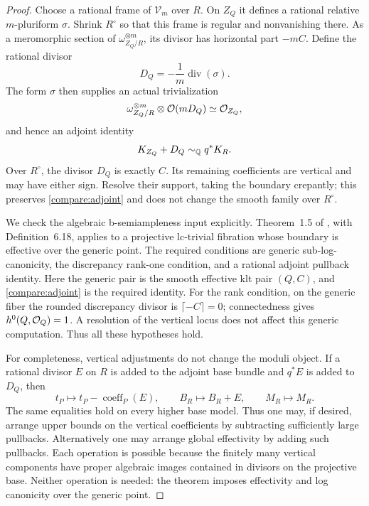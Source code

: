 \begin{proof}
Choose a rational frame of \(\mathcal V_m\) over \(R\).
On \(Z_Q\) it defines a rational relative \(m\)-pluriform
\(\sigma\).  Shrink \(R^\circ\) so that this frame is regular and
nonvanishing there.  As a meromorphic section of
\(\omega_{Z_Q/R}^{\otimes m}\), its divisor has horizontal part
\(-mC\).  Define the rational divisor
\begin{equation}
\label{compare:volume-boundary}
 D_Q=-\frac1m\operatorname{div}(\sigma).
\end{equation}
The form \(\sigma\) then supplies an actual trivialization
\[
 \omega_{Z_Q/R}^{\otimes m}\otimes\mathcal O(mD_Q)\simeq\mathcal O_{Z_Q},
\]
and hence an adjoint identity
\begin{equation}
\label{compare:adjoint}
 K_{Z_Q}+D_Q\sim_{\mathbb Q}q^*K_R.
\end{equation}
Over \(R^\circ\), the divisor \(D_Q\) is exactly \(C\).
Its remaining coefficients are vertical and may have either sign.
Resolve their support, taking the boundary crepantly; this preserves
\eqref{compare:adjoint} and does not change the smooth family over
\(R^\circ\).

We check the algebraic b-semiampleness input explicitly.
Theorem~1.5 of \cite{BFMT25}, with Definition~6.18, applies to a
projective lc-trivial fibration whose boundary is effective over the
generic point.  The required conditions are generic sub-log-canonicity,
the discrepancy rank-one condition, and a rational adjoint pullback
identity.  Here the generic pair is the smooth effective klt pair
\((Q,C)\), and \eqref{compare:adjoint} is the required identity.
For the rank condition, on the generic fiber the rounded
discrepancy divisor is \(\lceil-C\rceil=0\); connectedness gives
\(h^0(Q,\mathcal O_Q)=1\).  A resolution of the vertical locus does not
affect this generic computation.  Thus all these hypotheses hold.

For completeness, vertical adjustments do not change the moduli
object.  If a rational divisor \(E\) on \(R\) is added to the
adjoint base bundle and \(q^*E\) is added to \(D_Q\), then
\[
 t_P\longmapsto t_P-\operatorname{coeff}_P(E),
 \qquad
 B_R\longmapsto B_R+E,
 \qquad
 M_R\longmapsto M_R.
\]
The same equalities hold on every higher base model.
Thus one may, if desired, arrange upper bounds on the vertical
coefficients by subtracting sufficiently large pullbacks.
Alternatively one may arrange global effectivity by adding such
pullbacks.  Each operation is possible because the finitely many
vertical components have proper algebraic images contained in
divisors on the projective base.  Neither operation is needed:
the theorem imposes effectivity and log canonicity over the generic
point.


\end{proof}
